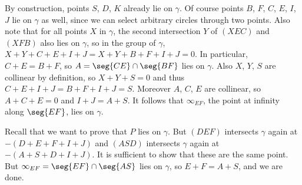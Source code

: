 By construction, points $S$, $D$, $K$ already lie on $\gamma$. Of course points $B$, $F$, $C$, $E$, $I$, $J$ lie on $\gamma$ as well, since we can select arbitrary circles through two points. Also note that for all points $X$ in $\gamma$, the second intersection $Y$ of $(XEC)$ and $(XFB)$ also lies on $\gamma$, so in the group of $\gamma$, $X+Y+C+E+I+J=X+Y+B+F+I+J=0$. In particular, $C+E=B+F$, so $A=\seg{CE}\cap\seg{BF}$ lies on $\gamma$. Also $X$, $Y$, $S$ are collinear by definition, so $X+Y+S=0$ and thus $C+E+I+J=B+F+I+J=S$. Moreover $A$, $C$, $E$ are collinear, so $A+C+E=0$ and $I+J=A+S$. It follows that $\infty_{EF}$, the point at infinity along $\seg{EF}$, lies on $\gamma$.

Recall that we want to prove that $P$ lies on $\gamma$. But $(DEF)$ intersects $\gamma$ again at $-(D+E+F+I+J)$ and $(ASD)$ intersects $\gamma$ again at $-(A+S+D+I+J)$. It is sufficient to show that these are the same point. But $\infty_{EF}=\seg{EF}\cap\seg{AS}$ lies on $\gamma$, so $E+F=A+S$, and we are done.


